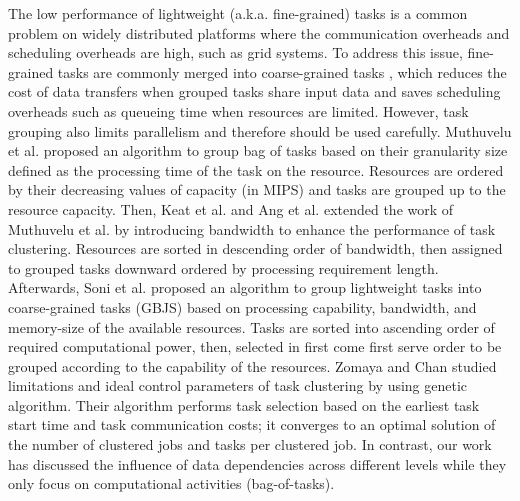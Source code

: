 The low performance of lightweight (a.k.a. fine-grained) tasks is a common problem on widely distributed platforms where the communication overheads and scheduling overheads are high, such as grid systems. To address this issue, fine-grained tasks are commonly merged into coarse-grained tasks \cite{Muthuvelu2005, Muthuvelu2013, Keat2006}, which reduces the cost of data transfers when grouped tasks share input data \cite{Muthuvelu2005} and saves scheduling overheads such as queueing time when resources are limited. However, task grouping also limits parallelism and therefore should be used carefully. Muthuvelu et al. \cite{Muthuvelu2013} proposed an algorithm to group bag of tasks based on their granularity size defined as the processing time of the task on the resource. Resources are ordered by their decreasing values of capacity (in MIPS) and tasks are grouped up to the resource capacity. Then, Keat et al. \cite{Keat2006} and Ang et al. \cite{Ang2009} extended the work of Muthuvelu et al. by introducing bandwidth to enhance the performance of task clustering. Resources are sorted in descending order of bandwidth, then assigned to grouped tasks downward ordered by processing requirement length. Afterwards, Soni et al. \cite{Soni2010} proposed an algorithm to group lightweight tasks into coarse-grained tasks (GBJS) based on processing capability, bandwidth, and memory-size of the available resources. Tasks are sorted into ascending order of required computational power, then, selected in first come first serve order to be grouped according to the capability of the resources. Zomaya and Chan \cite{Zomaya2004} studied limitations and ideal control parameters of task clustering by using genetic algorithm. Their algorithm performs task selection based on the earliest task start time and task communication costs; it converges to an optimal solution of the number of clustered jobs and tasks per clustered job. In contrast, our work has discussed the influence of data dependencies across different levels while they only focus on computational activities (bag-of-tasks). 


